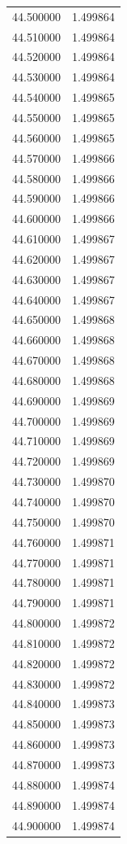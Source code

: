 \begin{tabular}{rr}
44.500000 & 1.499864 \\
44.510000 & 1.499864 \\
44.520000 & 1.499864 \\
44.530000 & 1.499864 \\
44.540000 & 1.499865 \\
44.550000 & 1.499865 \\
44.560000 & 1.499865 \\
44.570000 & 1.499866 \\
44.580000 & 1.499866 \\
44.590000 & 1.499866 \\
44.600000 & 1.499866 \\
44.610000 & 1.499867 \\
44.620000 & 1.499867 \\
44.630000 & 1.499867 \\
44.640000 & 1.499867 \\
44.650000 & 1.499868 \\
44.660000 & 1.499868 \\
44.670000 & 1.499868 \\
44.680000 & 1.499868 \\
44.690000 & 1.499869 \\
44.700000 & 1.499869 \\
44.710000 & 1.499869 \\
44.720000 & 1.499869 \\
44.730000 & 1.499870 \\
44.740000 & 1.499870 \\
44.750000 & 1.499870 \\
44.760000 & 1.499871 \\
44.770000 & 1.499871 \\
44.780000 & 1.499871 \\
44.790000 & 1.499871 \\
44.800000 & 1.499872 \\
44.810000 & 1.499872 \\
44.820000 & 1.499872 \\
44.830000 & 1.499872 \\
44.840000 & 1.499873 \\
44.850000 & 1.499873 \\
44.860000 & 1.499873 \\
44.870000 & 1.499873 \\
44.880000 & 1.499874 \\
44.890000 & 1.499874 \\
44.900000 & 1.499874 \\

\end{tabular}
